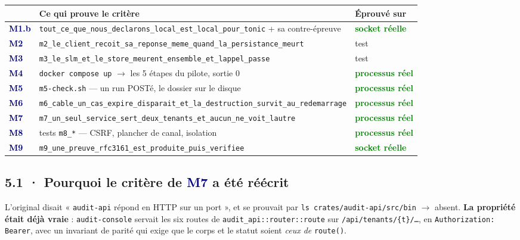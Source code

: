 \documentclass[10pt]{article}
\newcommand{\best}[1]{\textcolor{green}{\textbf{#1}}}
\newcommand{\code}[1]{\texttt{\small #1}}
\newcommand{\fl}{$\rightarrow$}
\newcommand{\mm}[1]{\textbf{\textcolor{navy}{#1}}}
\begin{document}
\begin{center}\small
\renewcommand{\arraystretch}{1.22}
\begin{tabular}{@{}>{\raggedright\arraybackslash}p{1.1cm} >{\raggedright\arraybackslash}p{9.4cm} >{\raggedright\arraybackslash}p{5.2cm}@{}}
\toprule
& \textbf{Ce qui prouve le critère} & \textbf{Éprouvé sur} \\
\midrule
\mm{M1.b} & \code{tout\_ce\_que\_nous\_declarons\_local\_est\_local\_pour\_tonic} + sa contre-épreuve & \best{socket réelle} \\
\mm{M2} & \code{m2\_le\_client\_recoit\_sa\_reponse\_meme\_quand\_la\_persistance\_meurt} & test \\
\mm{M3} & \code{m3\_le\_slm\_et\_le\_store\_meurent\_ensemble\_et\_lappel\_passe} & test \\
\mm{M4} & \code{docker compose up} \fl{} les 5 étapes du pilote, sortie 0 & \best{processus réel} \\
\mm{M5} & \code{m5-check.sh} --- un run POSTé, le dossier sur le disque & \best{processus réel} \\
\mm{M6} & \code{m6\_cable\_un\_cas\_expire\_disparait\_et\_la\_destruction\_survit\_au\_redemarrage} & \best{processus réel} \\
\mm{M7} & \code{m7\_un\_seul\_service\_sert\_deux\_tenants\_et\_aucun\_ne\_voit\_lautre} & \best{processus réel} \\
\mm{M8} & 12 tests \code{m8\_*} --- CSRF, plancher de canal, isolation & \best{processus réel} \\
\mm{M9} & \code{m9\_une\_preuve\_rfc3161\_est\_produite\_puis\_verifiee} & \best{socket réelle} \\
\bottomrule
\end{tabular}
\end{center}

\subsection{5.1 · Pourquoi le critère de \mm{M7} a été réécrit}

L'original disait « \code{audit-api} répond en HTTP sur un port », et se prouvait par
\code{ls crates/audit-api/src/bin} \fl{} absent. \textbf{La propriété était déjà vraie} :
\code{audit-console} servait les six routes de \code{audit\_api::router::route} sur
\code{/api/tenants/\{t\}/…}, en \code{Authorization: Bearer}, avec un invariant de parité qui exige
que le corps et le statut soient \emph{ceux de} \code{route()}.
\end{document}
